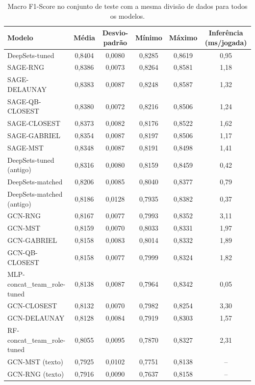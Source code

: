 \begin{table}[htbp]
    \centering
    \caption{Macro F1-Score no conjunto de teste com a mesma divis\~ao de dados para todos os modelos.}
    \label{tab:comparacao_justa}
    \begin{tabular}{lccccc}
        \hline
        Modelo & M\'edia & Desvio-padr\~ao & M\'inimo & M\'aximo & Infer\^encia (ms/jogada) \\
        \hline
        DeepSets-tuned & 0,8404 & 0,0080 & 0,8285 & 0,8619 & 0,95 \\
        SAGE-RNG & 0,8386 & 0,0073 & 0,8264 & 0,8581 & 1,18 \\
        SAGE-DELAUNAY & 0,8383 & 0,0087 & 0,8248 & 0,8587 & 1,32 \\
        SAGE-QB-CLOSEST & 0,8380 & 0,0072 & 0,8216 & 0,8506 & 1,24 \\
        SAGE-CLOSEST & 0,8373 & 0,0082 & 0,8176 & 0,8522 & 1,62 \\
        SAGE-GABRIEL & 0,8354 & 0,0087 & 0,8197 & 0,8506 & 1,17 \\
        SAGE-MST & 0,8348 & 0,0087 & 0,8191 & 0,8498 & 1,41 \\
        DeepSets-tuned (antigo) & 0,8316 & 0,0080 & 0,8159 & 0,8459 & 0,42 \\
        DeepSets-matched & 0,8206 & 0,0085 & 0,8040 & 0,8377 & 0,79 \\
        DeepSets-matched (antigo) & 0,8186 & 0,0128 & 0,7935 & 0,8382 & 0,37 \\
        GCN-RNG & 0,8167 & 0,0077 & 0,7993 & 0,8352 & 3,11 \\
        GCN-MST & 0,8159 & 0,0070 & 0,8033 & 0,8331 & 1,97 \\
        GCN-GABRIEL & 0,8158 & 0,0083 & 0,8014 & 0,8332 & 1,89 \\
        GCN-QB-CLOSEST & 0,8158 & 0,0077 & 0,7999 & 0,8324 & 1,82 \\
        MLP-concat\_team\_role-tuned & 0,8138 & 0,0087 & 0,7964 & 0,8342 & 0,05 \\
        GCN-CLOSEST & 0,8132 & 0,0070 & 0,7982 & 0,8254 & 3,30 \\
        GCN-DELAUNAY & 0,8128 & 0,0084 & 0,7919 & 0,8303 & 1,57 \\
        RF-concat\_team\_role-tuned & 0,8055 & 0,0095 & 0,7870 & 0,8327 & 2,31 \\
        GCN-MST (texto) & 0,7925 & 0,0102 & 0,7751 & 0,8138 & -- \\
        GCN-RNG (texto) & 0,7916 & 0,0090 & 0,7637 & 0,8158 & -- \\

\end{tabular}
\end{table}
